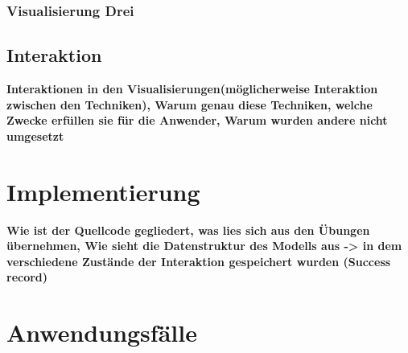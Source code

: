\documentclass[usegeometry=true]{scrartcl}
\begin{document}
\subsubsection{Visualisierung Drei}

\subsection{Interaktion}

\textbf{Interaktionen in den Visualisierungen(möglicherweise Interaktion zwischen den Techniken), Warum genau diese Techniken, welche Zwecke erfüllen sie für die Anwender, Warum wurden andere nicht umgesetzt}

\section{Implementierung}


\textbf{Wie ist der Quellcode gegliedert, was lies sich aus den Übungen übernehmen, Wie sieht die Datenstruktur des Modells aus -> in dem verschiedene Zustände der Interaktion gespeichert wurden (Success record)}

\section{Anwendungsfälle}
\end{document}

